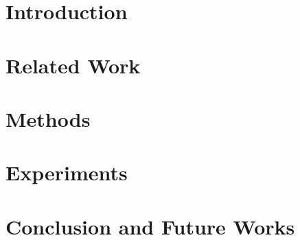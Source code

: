 \documentclass[a4,journal]{IEEEtran}
\begin{document}

    




\section{Introduction}
\label{sec:Intro}

\section{Related Work}
\label{sec:LitRev}


\section{Methods}
\label{sec:Method}


\section{Experiments}
\label{sec:Experiment}



\section{Conclusion and Future Works}
\label{sec:Conclude}







 
\end{document}
